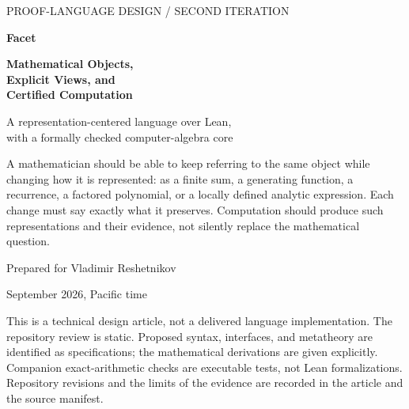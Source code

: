 \documentclass[11pt,a4paper]{article}
\theoremstyle{definition}
\begin{document}
\begin{titlepage}
{\sffamily\small\color{muted}PROOF-LANGUAGE DESIGN \quad / \quad SECOND ITERATION\par}
\vspace{19mm}
{\sffamily\bfseries\fontsize{38}{43}\selectfont\color{ink}Facet\par}
\vspace{5mm}
{\sffamily\bfseries\fontsize{25}{31}\selectfont\color{ink}
Mathematical Objects,\\Explicit Views, and\\Certified Computation\par}
\vspace{10mm}
{\Large A representation-centered language over Lean,\\with a formally checked computer-algebra core\par}
\vspace{12mm}
\begin{designbox}
A mathematician should be able to keep referring to the same object while changing
how it is represented: as a finite sum, a generating function, a recurrence, a
factored polynomial, or a locally defined analytic expression. Each change must
say exactly what it preserves. Computation should produce such representations
and their evidence, not silently replace the mathematical question.
\end{designbox}
\vfill
{\large Prepared for Vladimir Reshetnikov\par}
{ September 2026, Pacific time\par}
\vspace{5mm}
{\small\color{muted}
This is a technical design article, not a delivered language implementation.
The repository review is static. Proposed syntax, interfaces, and metatheory are
identified as specifications; the mathematical derivations are given explicitly.
Companion exact-arithmetic checks are executable tests, not Lean formalizations.
Repository revisions and the limits of the evidence are recorded in the article
and the source manifest.}
\end{titlepage}
\end{document}
